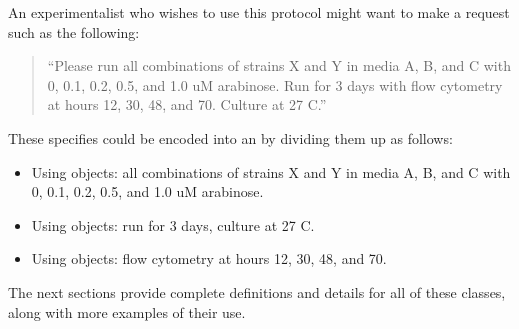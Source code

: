 An experimentalist who wishes to use this protocol might want to make a request such as the following:
\begin{quote}
``Please run all combinations of strains X and Y in media A, B, and C with 0, 0.1, 0.2, 0.5, and 1.0 uM arabinose. Run for 3 days with flow cytometry at hours 12, 30, 48, and 70. Culture at 27 C.''
\end{quote}
These specifies could be encoded into an  by dividing them up as follows:
\begin{itemize}
\item Using  objects: all combinations of strains X and Y in media A, B, and C with 0, 0.1, 0.2, 0.5, and 1.0 uM arabinose.
\item Using  objects: run for 3 days, culture at 27 C.
\item Using  objects: flow cytometry at hours 12, 30, 48, and 70.
\end{itemize}

The next sections provide complete definitions and details for all of these classes, along with more examples of their use.
